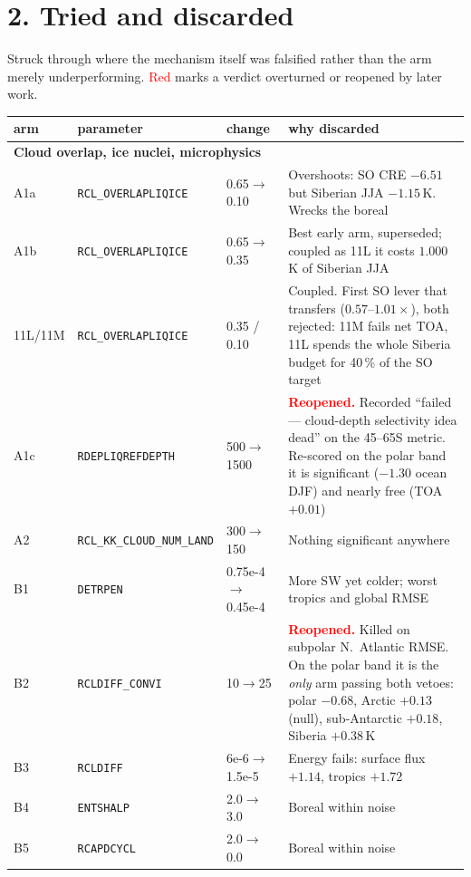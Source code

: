 \documentclass[9pt,a4paper]{article}
\begin{document}
\newpage
\section*{2. Tried and discarded}
Struck through where the mechanism itself was falsified rather than the arm merely
underperforming. \textcolor{red}{Red} marks a verdict overturned or reopened by later work.

\begin{center}\footnotesize
\begin{longtable}{p{} p{} p{} p{}}
\toprule
arm & parameter & change & why discarded \\
\midrule\endhead
\multicolumn{4}{l}{\textbf{Cloud overlap, ice nuclei, microphysics}}\\
A1a & \texttt{RCL\_OVERLAPLIQICE} & 0.65$\to$0.10 & Overshoots: SO CRE $-6.51$ but Siberian JJA $-1.15$\,K. Wrecks the boreal \\
A1b & \texttt{RCL\_OVERLAPLIQICE} & 0.65$\to$0.35 & Best early arm, superseded; coupled as 11L it costs $1.000$\,K of Siberian JJA \\
11L/11M & \texttt{RCL\_OVERLAPLIQICE} & 0.35 / 0.10 & Coupled. First SO lever that transfers ($0.57$--$1.01\times$), both rejected: 11M fails net TOA, 11L spends the whole Siberia budget for 40\,\% of the SO target \\
A1c & \texttt{RDEPLIQREFDEPTH} & 500$\to$1500 & \textcolor{red}{\textbf{Reopened.}} Recorded ``failed --- cloud-depth selectivity idea dead'' on the 45--65S metric. Re-scored on the polar band it is significant ($-1.30$ ocean DJF) and nearly free (TOA $+0.01$) \\
A2 & \texttt{RCL\_KK\_CLOUD\_NUM\_LAND} & 300$\to$150 & Nothing significant anywhere \\
B1 & \texttt{DETRPEN} & 0.75e-4$\to$0.45e-4 & More SW yet colder; worst tropics and global RMSE \\
B2 & \texttt{RCLDIFF\_CONVI} & 10$\to$25 & \textcolor{red}{\textbf{Reopened.}} Killed on subpolar N.\ Atlantic RMSE. On the polar band it is the \emph{only} arm passing both vetoes: polar $-0.68$, Arctic $+0.13$ (null), sub-Antarctic $+0.18$, Siberia $+0.38$\,K \\
B3 & \texttt{RCLDIFF} & 6e-6$\to$1.5e-5 & Energy fails: surface flux $+1.14$, tropics $+1.72$ \\
B4 & \texttt{ENTSHALP} & 2.0$\to$3.0 & Boreal within noise \\
B5 & \texttt{RCAPDCYCL} & 2.0$\to$0.0 & Boreal within noise \\

\end{longtable}
\end{center}
\end{document}
